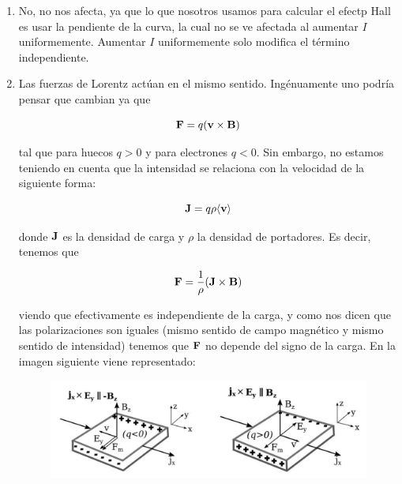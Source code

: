 \begin{enumerate}[label=\alph*)]
	\item No, no nos afecta, ya que lo que nosotros usamos para calcular el efectp Hall es usar la pendiente de la curva, la cual no se ve afectada al aumentar $I$ uniformemente. Aumentar $I$ uniformemente solo modifica el término independiente.

	\item Las fuerzas de Lorentz actúan en el mismo sentido. Ingénuamente uno podría pensar que cambian ya que

	      \[
		      \mathbf{F} = q (\mathbf{v} \times \mathbf{B})
	      \]

	      tal que para huecos $q>0$ y para electrones $q<0$. Sin embargo, no estamos teniendo en cuenta que la intensidad se relaciona con la velocidad de la siguiente forma:

	      \[
		      \mathbf{J} = q \rho \langle \mathbf{v} \rangle
	      \]

	      donde $\mathbf{J}$ es la densidad de carga y $\rho$ la densidad de portadores. Es decir, tenemos que

	      \[
		      \mathbf{F} = \frac{1}{\rho} (\mathbf{J} \times \mathbf{B})
	      \]

	      viendo que efectivamente es independiente de la carga, y como nos dicen que las polarizaciones son iguales (mismo sentido de campo magnético y mismo sentido de intensidad) tenemos que $\mathbf{F}$ no depende del signo de la carga. En la imagen siguiente viene representado:

	      \begin{figure}[H] \centering
		      \includegraphics[width=0.8\linewidth]{Cuerpo/Ch_02/Examen_24_6.png}
	      \end{figure}


\end{enumerate}
\vspace*{2em}

